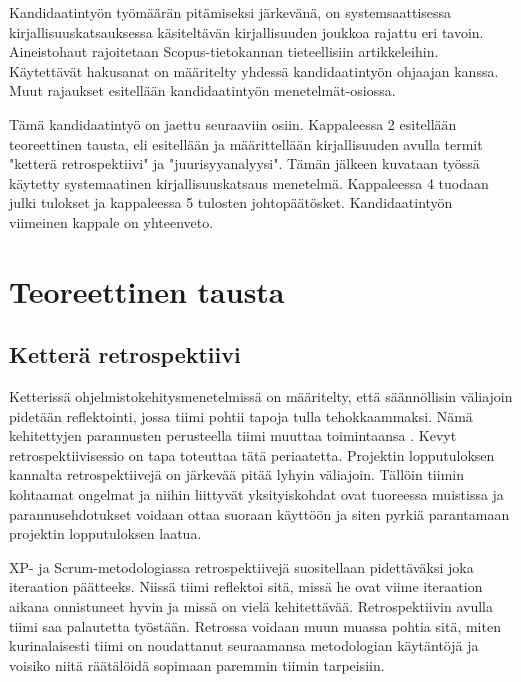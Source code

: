 Kandidaatintyön työmäärän pitämiseksi järkevänä, on systemsaattisessa kirjallisuuskatsauksessa käsiteltävän kirjallisuuden joukkoa rajattu eri tavoin. Aineistohaut rajoitetaan Scopus-tietokannan tieteellisiin artikkeleihin. Käytettävät hakusanat on määritelty yhdessä kandidaatintyön ohjaajan kanssa. Muut rajaukset esitellään kandidaatintyön menetelmät-osiossa.

Tämä kandidaatintyö on jaettu seuraaviin osiin. Kappaleessa 2 esitellään teoreettinen tausta, eli esitellään ja määrittellään kirjallisuuden avulla termit "ketterä retrospektiivi" ja "juurisyyanalyysi". Tämän jälkeen kuvataan työssä käytetty systemaatinen kirjallisuuskatsaus menetelmä. Kappaleessa 4 tuodaan julki tulokset ja kappaleessa 5 tulosten johtopäätösket. Kandidaatintyön viimeinen kappale on yhteenveto.

\section{Teoreettinen tausta}

\subsection{Ketterä retrospektiivi}
Ketterissä ohjelmistokehitysmenetelmissä on määritelty, että säännöllisin väliajoin pidetään reflektointi, jossa tiimi pohtii tapoja tulla tehokkaammaksi. Nämä kehitettyjen parannusten perusteella tiimi muuttaa toimintaansa \citep{AgileManifestoPrinciples}. Kevyt retrospektiivisessio on tapa toteuttaa tätä periaatetta. Projektin lopputuloksen kannalta retrospektiivejä on järkevää pitää lyhyin väliajoin. Tällöin tiimin kohtaamat ongelmat ja niihin liittyvät yksityiskohdat ovat tuoreessa muistissa ja parannusehdotukset voidaan ottaa suoraan käyttöön ja siten pyrkiä parantamaan projektin lopputuloksen laatua. \citep{Cockburn2002}

XP- ja Scrum-metodologiassa retrospektiivejä suositellaan pidettäväksi joka iteraation päätteeks. Niissä tiimi reflektoi sitä, missä he ovat viime iteraation aikana onnistuneet hyvin ja missä on vielä kehitettävää. \citep{Lindstrom2004, ScrumGuide2011} Retrospektiivin avulla tiimi saa palautetta työstään. Retrossa voidaan muun muassa pohtia sitä, miten kurinalaisesti tiimi on noudattanut seuraamansa metodologian käytäntöjä ja voisiko niitä räätälöidä sopimaan paremmin tiimin tarpeisiin. \citep{Lindstrom2004}


